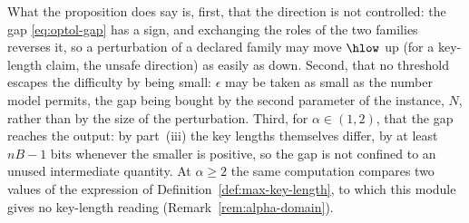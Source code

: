 \begin{remark}
What the proposition does say is, first, that the direction is not
controlled: the gap \eqref{eq:optol-gap} has a sign, and exchanging the
roles of the two families reverses it, so a perturbation of a declared
family may move $\hlow$ up (for a key-length claim, the unsafe direction)
as easily as down. Second, that no threshold escapes the difficulty by
being small: $\epsilon$ may be taken as small as the number model
permits, the gap being bought by the second parameter of the instance,
$N$, rather than by the size of the perturbation. Third, for
$\alpha\in(1,2)$, that the gap reaches the output: by part~(iii) the key
lengths themselves differ, by at least $nB-1$ bits whenever the smaller is
positive, so the gap is not confined to an unused intermediate quantity. At $\alpha\ge2$ the same computation compares
two values of the expression of Definition~\ref{def:max-key-length}, to which this
module gives no key-length reading (Remark~\ref{rem:alpha-domain}).
\end{remark}

